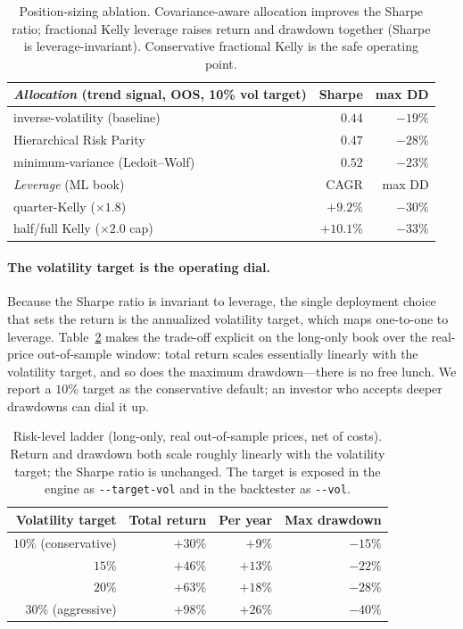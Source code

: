 \documentclass[11pt,a4paper]{article}
\theoremstyle{definition}
\begin{document}
\begin{table}[H]
\centering
\begin{tabular}{lrr}
\toprule
\emph{Allocation} (trend signal, OOS, 10\% vol target) & Sharpe & max DD \\
\midrule
inverse-volatility (baseline)        & $0.44$ & $-19\%$ \\
Hierarchical Risk Parity             & $0.47$ & $-28\%$ \\
minimum-variance (Ledoit--Wolf)      & $\mathbf{0.52}$ & $-23\%$ \\
\midrule
\emph{Leverage} (ML book)            & CAGR & max DD \\
\midrule
quarter-Kelly ($\times 1.8$)         & $+9.2\%$ & $-30\%$ \\
half/full Kelly ($\times 2.0$ cap)   & $+10.1\%$ & $-33\%$ \\
\bottomrule
\end{tabular}
\caption{Position-sizing ablation. Covariance-aware allocation improves the Sharpe ratio; fractional
Kelly leverage raises return and drawdown together (Sharpe is leverage-invariant). Conservative
fractional Kelly is the safe operating point.}
\label{tab:sizing}
\end{table}

\paragraph{The volatility target is the operating dial.} Because the Sharpe ratio is invariant to
leverage, the single deployment choice that sets the return is the annualized volatility target,
which maps one-to-one to leverage. Table~\ref{tab:voltarget} makes the trade-off explicit on the
long-only book over the real-price out-of-sample window: total return scales essentially linearly
with the volatility target, and so does the maximum drawdown---there is no free lunch. We report a
$10\%$ target as the conservative default; an investor who accepts deeper drawdowns can dial it up.

\begin{table}[H]
\centering
\begin{tabular}{rrrr}
\toprule
Volatility target & Total return & Per year & Max drawdown \\
\midrule
$10\%$ (conservative)  & $+30\%$ & $+9\%$  & $-15\%$ \\
$15\%$                 & $+46\%$ & $+13\%$ & $-22\%$ \\
$20\%$                 & $+63\%$ & $+18\%$ & $-28\%$ \\
$30\%$ (aggressive)    & $+98\%$ & $+26\%$ & $-40\%$ \\
\bottomrule
\end{tabular}
\caption{Risk-level ladder (long-only, real out-of-sample prices, net of costs). Return and drawdown
both scale roughly linearly with the volatility target; the Sharpe ratio is unchanged. The target is
exposed in the engine as \texttt{-{}-target-vol} and in the backtester as \texttt{-{}-vol}.}
\label{tab:voltarget}
\end{table}
\end{document}
